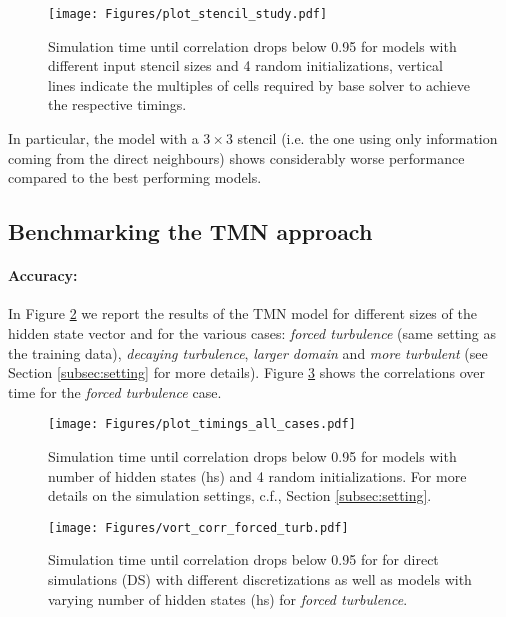 \begin{figure}[h!]
         \centering
         \texttt{[image: Figures/plot\_stencil\_study.pdf]}
     \caption{Simulation time until correlation drops below 0.95 for models with different input stencil sizes and 4 random initializations, vertical lines indicate the multiples of cells required by base solver to achieve the respective timings.}
     \label{fig:stencil_study}
\end{figure}

In particular, the model with a $3\times3$ stencil (i.e. the one using only information coming from the direct neighbours) shows considerably worse performance compared to the best performing models. 

\subsection{Benchmarking the TMN approach}
\label{sec:latent_study}

\paragraph{Accuracy:} 
In Figure \ref{fig:results_vort_corr}  we report the results of the TMN model for different sizes of the hidden state vector and for the various cases: \textit{forced turbulence} (same setting as the training data), \textit{decaying turbulence}, \textit{larger domain} and \textit{more turbulent} (see Section \ref{subsec:setting} for more details). Figure \ref{fig:corr_time_force_turb} shows the correlations over time for the \textit{forced turbulence} case.

\begin{figure}[h!]
    \centering
    \texttt{[image: Figures/plot\_timings\_all\_cases.pdf]}
    \caption{Simulation time until correlation drops below 0.95 for models with number of hidden states (hs) and 4 random initializations. For more details on the simulation settings, c.f., Section \ref{subsec:setting}. }
    \label{fig:results_vort_corr}  
\end{figure}

\begin{figure}[h!]
    \centering
         \texttt{[image: Figures/vort\_corr\_forced\_turb.pdf]}
    \caption{Simulation time until correlation drops below 0.95 for for direct simulations (DS) with different discretizations as well as models with varying number of hidden states (hs) for \textit{forced turbulence}.}
    \label{fig:corr_time_force_turb}
\end{figure}

